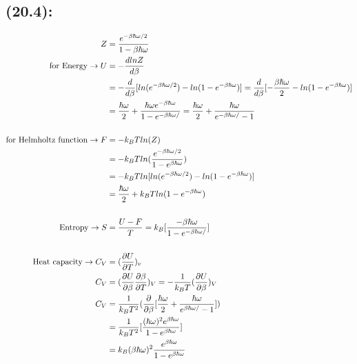 \begin{latin}
    \section*{(20.4):}
    \begin{alignat*}{2}
        Z &= \frac{e^{-\beta \hbar \omega/2}}{1 -\beta \hbar \omega}\\
        \textmd{for Energy} \to U&= -\frac{dlnZ}{d\beta}\\
        &= -\frac{d}{d\beta}[ln(e^{-\beta \hbar \omega/2}) - ln(1-e^{-\beta \hbar \omega})]= \frac{d}{d\beta}[-\frac{\beta \hbar \omega}{2}- ln(1-e^{-\beta \hbar \omega})]\\
        &= \frac{\hbar \omega}{2} + \frac{\hbar \omega e^{-\beta \hbar \omega}}{1-e^{-\beta \hbar \omega/}}= \frac{\hbar \omega}{2} + \frac{\hbar \omega }{e^{-\beta \hbar \omega/}-1}\\\\
        \text{for Helmholtz function} \to F &= -k_BTln(Z)\\
        &= -k_BTln(\frac{e^{-\beta \hbar \omega/2}}{1 -e^{\beta \hbar \omega}})\\
        &= -k_B Tln [ln(e^{-\beta \hbar \omega/2}) - ln(1-e^{-\beta \hbar \omega})]\\
        &= \frac{\hbar \omega}{2} + k_BT ln (1-e^{-\beta \hbar \omega})\\\\
        \textmd{Entropy}\to S&= \frac{U-F}{T} = k_B [\frac{-\beta \hbar \omega}{1-e^{-\beta \hbar \omega/}}]\\\\
        \text{Heat capacity}\to C_V &= (\frac{\partial U}{\partial T})_v \\
        C_V &= (\frac{\partial U}{\partial \beta}\frac{\partial \beta}{\partial T})_V = -\frac{1}{k_B T}(\frac{\partial U}{\partial \beta})_V\\
        C_V &= \frac{1}{k_B T^2}(\frac{\partial }{\partial \beta}[\frac{\hbar \omega}{2} + \frac{\hbar \omega }{e^{\beta \hbar \omega/}-1}])\\
        &= \frac{1}{k_B T^2}[\frac{(\hbar \omega)^2e^{\beta \hbar \omega}}{1-e^{\beta \hbar \omega}}]\\
        &=k_B (\beta \hbar \omega)^2\frac{e^{\beta \hbar \omega}}{1-e^{\beta \hbar \omega}}
    \end{alignat*}

\end{latin}
